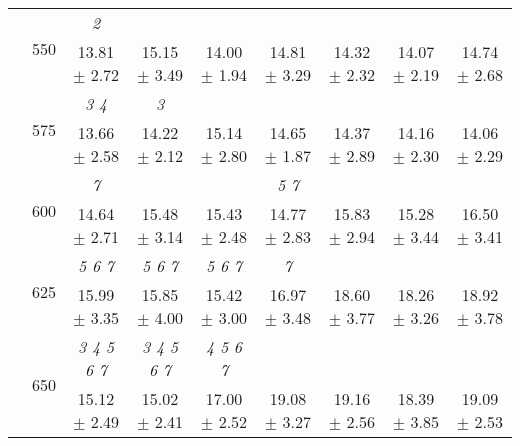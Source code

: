 \begin{table}[h]
{\begin{tabular}{
        ccccccccc}
 & \multirow{2}{*}{550}& \textit{ 2 }& & & & & &  \\ 
 & & 13.81 $\pm$ 2.72& 15.15 $\pm$ 3.49& 14.00 $\pm$ 1.94& 14.81 $\pm$ 3.29& 14.32 $\pm$ 2.32& 14.07 $\pm$ 2.19& 14.74 $\pm$ 2.68 \\ 
 & \multirow{2}{*}{575}& \cellcolor[HTML]{EFEFEF} \textit{ 3 4 }& \cellcolor[HTML]{EFEFEF} \textit{ 3 }& \cellcolor[HTML]{EFEFEF} & \cellcolor[HTML]{EFEFEF} & \cellcolor[HTML]{EFEFEF} & \cellcolor[HTML]{EFEFEF} & \cellcolor[HTML]{EFEFEF}  \\ 
 & & \cellcolor[HTML]{EFEFEF} 13.66 $\pm$ 2.58& \cellcolor[HTML]{EFEFEF} 14.22 $\pm$ 2.12& \cellcolor[HTML]{EFEFEF} 15.14 $\pm$ 2.80& \cellcolor[HTML]{EFEFEF} 14.65 $\pm$ 1.87& \cellcolor[HTML]{EFEFEF} 14.37 $\pm$ 2.89& \cellcolor[HTML]{EFEFEF} 14.16 $\pm$ 2.30& \cellcolor[HTML]{EFEFEF} 14.06 $\pm$ 2.29 \\ 
 & \multirow{2}{*}{600}& \textit{ 7 }& & & \textit{ 5 7 }& & &  \\ 
 & & 14.64 $\pm$ 2.71& 15.48 $\pm$ 3.14& 15.43 $\pm$ 2.48& 14.77 $\pm$ 2.83& 15.83 $\pm$ 2.94& 15.28 $\pm$ 3.44& 16.50 $\pm$ 3.41 \\ 
 & \multirow{2}{*}{625}& \cellcolor[HTML]{EFEFEF} \textit{ 5 6 7 }& \cellcolor[HTML]{EFEFEF} \textit{ 5 6 7 }& \cellcolor[HTML]{EFEFEF} \textit{ 5 6 7 }& \cellcolor[HTML]{EFEFEF} \textit{ 7 }& \cellcolor[HTML]{EFEFEF} & \cellcolor[HTML]{EFEFEF} & \cellcolor[HTML]{EFEFEF}  \\ 
 & & \cellcolor[HTML]{EFEFEF} 15.99 $\pm$ 3.35& \cellcolor[HTML]{EFEFEF} 15.85 $\pm$ 4.00& \cellcolor[HTML]{EFEFEF} 15.42 $\pm$ 3.00& \cellcolor[HTML]{EFEFEF} 16.97 $\pm$ 3.48& \cellcolor[HTML]{EFEFEF} 18.60 $\pm$ 3.77& \cellcolor[HTML]{EFEFEF} 18.26 $\pm$ 3.26& \cellcolor[HTML]{EFEFEF} 18.92 $\pm$ 3.78 \\ 
 & \multirow{2}{*}{650}& \textit{ 3 4 5 6 7 }& \textit{ 3 4 5 6 7 }& \textit{ 4 5 6 7 }& & & &  \\ 
 & & 15.12 $\pm$ 2.49& 15.02 $\pm$ 2.41& 17.00 $\pm$ 2.52& 19.08 $\pm$ 3.27& 19.16 $\pm$ 2.56& 18.39 $\pm$ 3.85& 19.09 $\pm$ 2.53 \\ \midrule 

        \bottomrule
        \end{tabular}%
        }

        \end{table}
        
